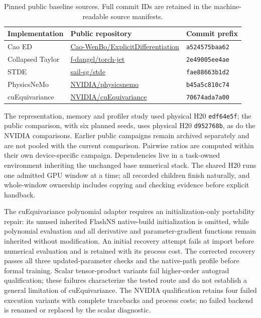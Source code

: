 \documentclass[11pt]{article}
\begin{document}
\begin{table}[h]
\centering\small
\caption{Pinned public baseline sources. Full commit IDs are retained in
the machine-readable source manifests.}\label{tab:sources}
\begin{tabular}{lll}\toprule
Implementation & Public repository & Commit prefix\\\midrule
Cao ED & \href{https://github.com/Cao-WenBo/ExplicitDifferentiation}{Cao-WenBo/ExplicitDifferentiation} & \texttt{a524575baa62}\\
Collapsed Taylor & \href{https://github.com/f-dangel/torch-jet}{f-dangel/torch-jet} & \texttt{2e49005ee4ae}\\
STDE & \href{https://github.com/sail-sg/stde}{sail-sg/stde} & \texttt{fae88663b1d2}\\
PhysicsNeMo & \href{https://github.com/NVIDIA/physicsnemo}{NVIDIA/physicsnemo} & \texttt{b45a5c810c74}\\
cuEquivariance & \href{https://github.com/NVIDIA/cuEquivariance}{NVIDIA/cuEquivariance} & \texttt{70674ada7a00}\\\bottomrule
\end{tabular}
\end{table}

The representation, memory and profiler study used physical H20
\texttt{edf64e5f}; the public comparison, with six planned seeds, uses
physical H20 \texttt{d952768b}, as do the NVIDIA comparisons. Earlier
public campaigns remain archived separately and are not pooled with the
current comparison. Pairwise ratios are computed within their own
device-specific campaign. Dependencies live in a task-owned environment
inheriting the unchanged base numerical stack. The shared H20 runs one
admitted GPU window at a time; all recorded children finish naturally, and
whole-window ownership includes copying and checking evidence before
explicit handback.

The cuEquivariance polynomial adapter requires an initialization-only
portability repair: its unused inherited FlashNS native-build
initialization is omitted, while polynomial evaluation and all derivative
and parameter-gradient functions remain inherited without modification. An
initial recovery attempt fails at import before numerical evaluation and is
retained with its process cost. The corrected recovery passes all three
updated-parameter checks and the native-path profile before formal
training. Scalar tensor-product variants fail higher-order autograd
qualification; these failures characterize the tested route and do not
establish a general limitation of cuEquivariance. The NVIDIA qualification
retains four failed execution variants with complete tracebacks and process
costs; no failed backend is renamed or replaced by the scalar diagnostic.
\end{document}
